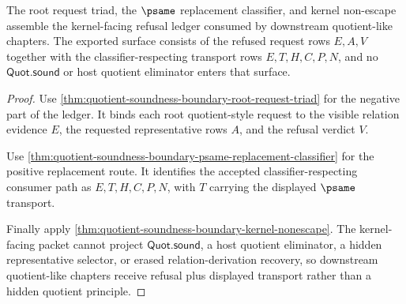 \begin{theorem}
\label{thm:quotient-soundness-boundary-kernel-refusal-ledger}
The root request triad, the $\psame$ replacement classifier, and kernel non-escape assemble the kernel-facing refusal ledger consumed by downstream quotient-like chapters. The exported surface consists of the refused request rows $E,A,V$ together with the classifier-respecting transport rows $E,T,H,C,P,N$, and no $\mathsf{Quot.sound}$ or host quotient eliminator enters that surface.
\end{theorem}
\begin{proof}
Use \autoref{thm:quotient-soundness-boundary-root-request-triad} for the negative part of the ledger. It binds each root quotient-style request to the visible relation evidence $E$, the requested representative rows $A$, and the refusal verdict $V$.

Use \autoref{thm:quotient-soundness-boundary-psame-replacement-classifier} for the positive replacement route. It identifies the accepted classifier-respecting consumer path as $E,T,H,C,P,N$, with $T$ carrying the displayed $\psame$ transport.

Finally apply \autoref{thm:quotient-soundness-boundary-kernel-nonescape}. The kernel-facing packet cannot project $\mathsf{Quot.sound}$, a host quotient eliminator, a hidden representative selector, or erased relation-derivation recovery, so downstream quotient-like chapters receive refusal plus displayed transport rather than a hidden quotient principle.
\end{proof}

